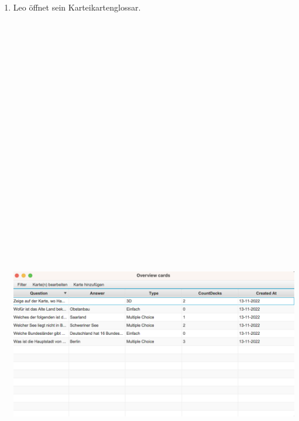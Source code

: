 \begin{enumerate}  
    \item Leo öffnet sein Karteikartenglossar.

        \begin{center}\includegraphics[width=17cm,height=35cm,keepaspectratio]{images/overview-details1.png}\end{center} 
       

\end{enumerate}
